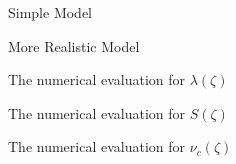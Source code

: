 
\newpage

\begin{figure}
\begin{center}
\leavevmode
\epsfysize=7cm
\caption{Simple Model}
\label{model1}
\end{center}
\end{figure}

\begin{figure}
\begin{center}
\leavevmode
\epsfysize=7cm
\caption{More Realistic Model}
\label{model2}
\end{center}
\end{figure}

\begin{figure}
\begin{center}
\leavevmode
\epsfysize=7cm
\caption{The numerical evaluation for $\lambda(\zeta)$}
\label{fig-lam}
\end{center}
\end{figure}

\begin{figure}
\begin{center}
\leavevmode
\epsfysize=7cm
\caption{The numerical evaluation for $S(\zeta)$}
\label{fig-ent}
\end{center}
\end{figure}

\begin{figure}
\begin{center}
\leavevmode
\epsfysize=7cm
\caption{The numerical evaluation for $\nu_c(\zeta)$}
\label{fig-cut}
\end{center}
\end{figure}


